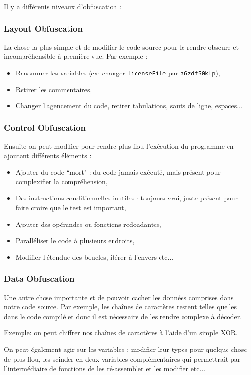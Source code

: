 \documentclass{article}
\begin{document}
Il y a différents niveaux d'obfuscation \cite{obfus} :

\subsubsection{Layout Obfuscation}
La chose la plus simple et de modifier le code source pour le rendre obscure et incompréhensible à première vue. Par exemple :
\begin{itemize}
    \item Renommer les variables (ex: changer \verb:licenseFile: par \verb:z6zdf50klp:),
    \item Retirer les commentaires,
    \item Changer l'agencement du code, retirer tabulations, sauts de ligne, espaces...
\end{itemize}

\subsubsection{Control Obfuscation}
Ensuite on peut modifier pour rendre plus flou l'exécution du programme en ajoutant différents éléments :
\begin{itemize}
    \item Ajouter du code ``mort" : du code jamais exécuté, mais présent pour complexifier la compréhension,
    \item Des instructions conditionnelles inutiles : toujours vrai, juste présent pour faire croire que le test est important,
    \item Ajouter des opérandes ou fonctions redondantes,
    \item Paralléliser le code à plusieurs endroits,
    \item Modifier l'étendue des boucles, itérer à l'envers etc...
\end{itemize}

\subsubsection{Data Obfuscation}
Une autre chose importante et de pouvoir cacher les données comprises dans notre code source. Par exemple, les chaînes de caractères restent telles quelles dans le code compilé et donc il est nécessaire de les rendre complexe à décoder.

Exemple: on peut chiffrer nos chaînes de caractères à l'aide d'un simple XOR.

On peut également agir sur les variables : modifier leur types pour quelque chose de plus flou, les scinder en deux variables complémentaires qui permettrait par l'intermédiaire de fonctions de les ré-assembler et les modifier etc...
\end{document}
